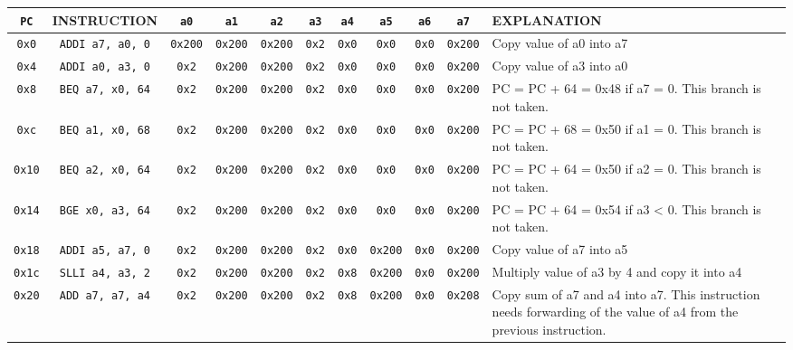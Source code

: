 \documentclass[a4paper,12pt]{article}
\begin{document}
\begin{landscape}


\begin{longtable}{|c c c c c c c c c c p{8cm}|}
\hline
\texttt{PC}    & \textbf{INSTRUCTION}     & \texttt{a0}    & \texttt{a1}    & \texttt{a2}    & \texttt{a3}  & \texttt{a4}   & \texttt{a5}    & \texttt{a6}   & \texttt{a7}    & \textbf{EXPLANATION}\\
\hline
\texttt{0x0}  & \texttt{ADDI a7, a0, 0}  & \texttt{0x200} & \texttt{0x200} & \texttt{0x200} & \texttt{0x2} & \texttt{0x0}  & \texttt{0x0}   & \texttt{0x0}  & \texttt{0x200} & Copy value of a0 into a7\\
\hline
\texttt{0x4}  & \texttt{ADDI a0, a3, 0}  & \texttt{0x2}   & \texttt{0x200} & \texttt{0x200} & \texttt{0x2} & \texttt{0x0}  & \texttt{0x0}   & \texttt{0x0}  & \texttt{0x200} & Copy value of a3 into a0\\
\hline
\texttt{0x8}  & \texttt{BEQ a7, x0, 64}  & \texttt{0x2}   & \texttt{0x200} & \texttt{0x200} & \texttt{0x2} & \texttt{0x0}  & \texttt{0x0}   & \texttt{0x0}  & \texttt{0x200} & PC = PC + 64 = 0x48 if a7 = 0. This branch is not taken.\\
\hline
\texttt{0xc}  & \texttt{BEQ a1, x0, 68}  & \texttt{0x2}   & \texttt{0x200} & \texttt{0x200} & \texttt{0x2} & \texttt{0x0}  & \texttt{0x0}   & \texttt{0x0}  & \texttt{0x200} & PC = PC + 68 = 0x50 if a1 = 0. This branch is not taken.\\
\hline
\texttt{0x10} & \texttt{BEQ a2, x0, 64}  & \texttt{0x2}   & \texttt{0x200} & \texttt{0x200} & \texttt{0x2} & \texttt{0x0}  & \texttt{0x0}   & \texttt{0x0}  & \texttt{0x200} & PC = PC + 64 = 0x50 if a2 = 0. This branch is not taken.\\
\hline
\texttt{0x14} & \texttt{BGE x0, a3, 64}  & \texttt{0x2}   & \texttt{0x200} & \texttt{0x200} & \texttt{0x2} & \texttt{0x0}  & \texttt{0x0}   & \texttt{0x0}  & \texttt{0x200} & PC = PC + 64 = 0x54 if a3 < 0. This branch is not taken.\\
\hline
\texttt{0x18} & \texttt{ADDI a5, a7, 0}  & \texttt{0x2}   & \texttt{0x200} & \texttt{0x200} & \texttt{0x2} & \texttt{0x0}  & \texttt{0x200} & \texttt{0x0}  & \texttt{0x200} & Copy value of a7 into a5\\
\hline
\texttt{0x1c} & \texttt{SLLI a4, a3, 2}  & \texttt{0x2}   & \texttt{0x200} & \texttt{0x200} & \texttt{0x2} & \texttt{0x8}  & \texttt{0x200} & \texttt{0x0}  & \texttt{0x200} & Multiply value of a3 by 4 and copy it into a4\\
\hline
\texttt{0x20} & \texttt{ADD a7, a7, a4}  & \texttt{0x2}   & \texttt{0x200} & \texttt{0x200} & \texttt{0x2} & \texttt{0x8}  & \texttt{0x200} & \texttt{0x0}  & \texttt{0x208} & Copy sum of a7 and a4 into a7. This instruction needs forwarding of the value of a4 from the previous instruction.\\

\end{longtable}
\end{landscape}
\end{document}

